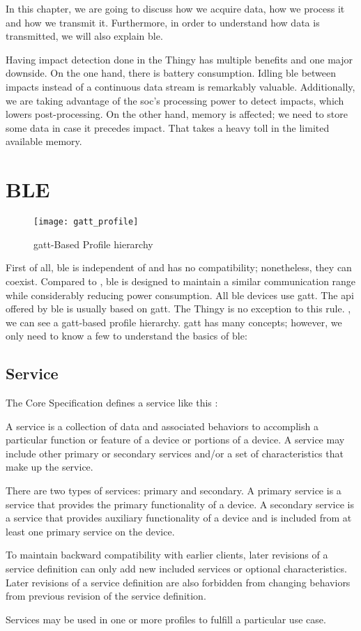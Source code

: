 In this chapter, we are going to discuss how we acquire data, how we process it and how we transmit it. Furthermore, in order to understand how data is transmitted, we will also explain \gls{ble}.

Having impact detection done in the Thingy has multiple benefits and one major downside. On the one hand, there is battery consumption. Idling \gls{ble} between impacts instead of a continuous data stream is remarkably valuable. Additionally, we are taking advantage of the \gls{soc}'s processing power to detect impacts, which lowers post-processing. On the other hand, memory is affected; we need to store some data in case it precedes impact. That takes a heavy toll in the limited available memory.

\section{BLE}\label{sc:ble}
\begin{figure}[hbt!]
	\centering
	\texttt{[image: gatt\_profile]}
	\caption{\gls{gatt}-Based Profile hierarchy}
	\label{fig:gatt}
\end{figure}
First of all, \gls{ble} is independent of \bt and has no compatibility; nonetheless, they can coexist. Compared to \bt, \gls{ble} is designed to maintain a similar communication range while considerably reducing power consumption. All \gls{ble} devices use \gls{gatt}. The \gls{api} offered by \gls{ble} is usually based on \gls{gatt}. The Thingy is no exception to this rule. , we can see a \gls{gatt}-based profile hierarchy. \gls{gatt} has many concepts; however, we only need to know a few to understand the basics of \gls{ble}:

\subsection{Service}
The \bt Core Specification defines a service like this \cite{bluetoothspecs}:
\begin{displayquote}
A service is a collection of data and associated behaviors to accomplish a particular function or feature of a device or portions of a device. A service may include other primary or secondary services and/or a set of characteristics that make up the service. 

There are two types of services: primary and secondary. A primary service is a service that provides the primary functionality of a device. A secondary service is a service that provides auxiliary functionality of a device and is included from at least one primary service on the device. 

To maintain backward compatibility with earlier clients, later revisions of a service definition can only add new included services or optional characteristics. Later revisions of a service definition are also forbidden from changing behaviors from previous revision of the service definition.

Services may be used in one or more profiles to fulfill a particular use case.
\end{displayquote}

